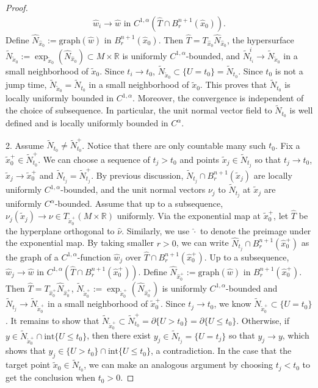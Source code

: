 \documentclass[11pt, letterpaper]{amsart}
\theoremstyle{definition}
\theoremstyle{remark}
\begin{document}
\begin{appendix}
\begin{proof}
\begin{align*}
		\hat{w}_i \to \hat{w} \text{ in } C^{1,\alpha }(\hat{T}\cap B^{n+1}_r(\hat{x}_0) ).
	\end{align*} 
	Define $\hat{N}_{\hat{x}_0}:= \mathrm{graph}(\hat{w})$ in $B^{n+1}_r(\hat{x}_0)$. Then $\hat{T}= T_{\hat{x}_0} \hat{N}_{\hat{x}_0}$, the hypersurface $\tilde{N}_{\tilde{x}_0}:= \exp_{\tilde{x}_0}(\hat{N}_{\hat{x}_0})\subset M \times \mathbb{R}$ is uniformly $C^{1,\alpha }$-bounded, and $\tilde{N}^{i}_{t_i} \to \tilde{N}_{\tilde{x}_0} $ in a small neighborhood of $\tilde{x}_0$. Since $t_i \to t_0$, $\tilde{N}_{\tilde{x}_0} \subset \{ U = t_0\} = \tilde{N}_{t_0} $. Since $t_0$ is not a jump time, $ \tilde{N}_{\tilde{x}_0} = \tilde{N}_{t_0}$ in a small neighborhood of $\tilde{x}_0$. This proves that $\tilde{N}_{t_0}$ is locally uniformly bounded in $C^{1,\alpha }$. Moreover, the convergence is independent of the choice of subsequence. In particular, the unit normal vector field to $\tilde{N}_{t_0}$ is well defined and is locally uniformly bounded in $C^{\alpha }$. 


	2. Assume $\tilde{N}_{t_0} \neq \tilde{N}^{+}_{t_0}$. Notice that there are only countable many such $t_0$. Fix a $\tilde{x}_0^+ \in \tilde{N}_{t_0}^{+}$. We can choose a sequence of $t_j > t_0$ and points $\tilde{x}_j \in \tilde{N}_{t_j}$ so that $t_j \to t_0$, $\tilde{x}_j \to \tilde{x}_0^+$ and $\tilde{N}_{t_j}= \tilde{N}^{+}_{t_j}$. By previous discussion,  $\tilde{N}_{t_j} \cap B^{n+1}_r(\tilde{x}_j) $ are locally uniformly $C^{1,\alpha }$-bounded, and the unit normal vectors $\nu _j$ to $\tilde{N}_{t_j}$ at $\tilde{x}_j$ are uniformly $C^{\alpha }$-bounded. Assume that up to a subsequence, $\nu _j(\tilde{x}_j) \to \nu \in T_{\tilde{x}_0^+} (M\times \mathbb{R})$ uniformly. Via the exponential map at $\tilde{x}_0^+$, let $\hat{T}$ be the hyperplane orthogonal to $\hat{\nu }$. Similarly, we use $\hat{\cdot }$ to denote the preimage under the exponential map. By taking smaller $r>0$, we can write $\hat{N}_{t_j} \cap B^{n+1}_r(\hat{x}_0^+)$ as the graph of a $C^{1,\alpha }$-function $\hat{w}_j$ over $\hat{T}\cap B^{n+1}_r(\hat{x}_0^+)$. Up to a subsequence, $\hat{w}_j \to \hat{w}$ in $C^{1,\alpha }(\hat{T}\cap B^{n+1}_r(\hat{x}_0^+) )$. Define $\hat{N}_{\hat{x}_0^+}:= \mathrm{graph}(\hat{w})$ in $B^{n+1}_r(\hat{x}_0^+)$. Then $\hat{T}= T_{\hat{x}_0^+} \hat{N}_{\hat{x}_0^+}$, $\tilde{N}_{\tilde{x}_0^+}:= \exp_{\tilde{x}_0^+}(\hat{N}_{\hat{x}_0^+})$ is uniformly $C^{1,\alpha }$-bounded and $\tilde{N}_{t_j} \to \tilde{N}_{\tilde{x}_0^+}$ in a small neighborhood of $\tilde{x}_0^+$. Since $t_j \to t_0$, we know $\tilde{N}_{\tilde{x}_0^+} \subset \{U= t_0\} $. It remains to show that $\tilde{N}_{\tilde{x}_0^+} \subset \tilde{N}^{+}_{t_0}= \partial \{U> t_0\} = \partial \{U \leq t_0\}  $. Otherwise, if $y \in \tilde{N}_{\tilde{x}_0^+} \cap \mathrm{int}\{U \leq t_0\} $, then there exist $y_j \in \tilde{N}_{t_j}= \{U= t_j\} $ so that $y_j \to y$, which shows that $y_j \in \{U>t_0\} \cap \mathrm{int} \{U \leq t_0\} $, a contradiction. In the case that the target point $\tilde{x}_0 \in \tilde{N}_{t_0}$, we can make an analogous argument by choosing $t_j<t_0$ to get the conclusion when $t_0>0$.


\end{proof}
\end{appendix}
\end{document}
